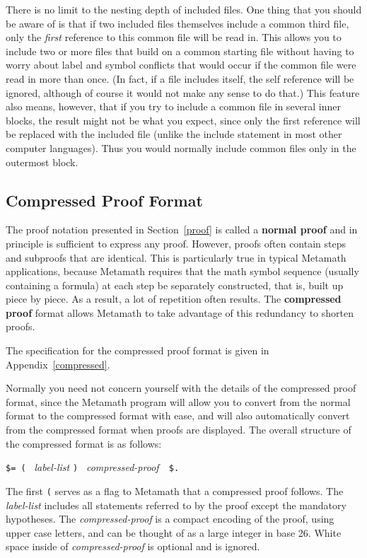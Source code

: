 There is no limit to the nesting depth of included files.  One thing that you
should be aware of is that if two included files themselves include a common
third file, only the {\em first} reference to this common file will be read
in.  This allows you to include two or more files that build on a common
starting file without having to worry about label and symbol conflicts that
would occur if the common file were read in more than once.  (In fact, if a
file includes itself, the self reference will be ignored, although of course
it would not make any sense to do that.)  This feature also means, however,
that if you try to include a common file in several inner blocks, the result
might not be what you expect, since only the first reference will be replaced
with the included file (unlike the include statement in most other computer
languages).  Thus you would normally include common files only in the
outermost block.

\subsection{Compressed Proof Format}\label{compressed1}

The proof notation presented in Section~\ref{proof} is called a
{\bf normal proof} and in principle is
sufficient to express any proof.  However, proofs often contain steps and
subproofs that are identical.  This is particularly true in typical
Metamath applications, because Metamath requires that the math
symbol sequence (usually containing a formula) at each step be separately
constructed, that is, built up piece by piece. As a result, a lot of
repetition often results.  The {\bf compressed proof} format allows Metamath
to take advantage of this redundancy to shorten proofs.

The specification for the compressed proof format is given in
Appen\-dix~\ref{compressed}.

Normally you need not concern yourself with the details of the compressed
proof format, since the Metamath program will allow you to convert from
the normal format to the compressed format with ease, and will also
automatically convert from the compressed format when proofs are displayed.
The overall structure of the compressed format is as follows:
\begin{center}
  \texttt{\$= ( } {\em label-list} \texttt{) } {\em compressed-proof\ }\ \texttt{\$.}
\end{center}
The first \texttt{(} serves as a flag to Metamath that a compressed proof
follows.  The {\em label-list} includes all statements referred to by the
proof except the mandatory hypotheses.  The {\em
compressed-proof} is a compact encoding of the proof, using upper case
letters, and can be thought of as a large integer in base 26.  White
space inside of {\em compressed-proof} is
optional and is ignored.

